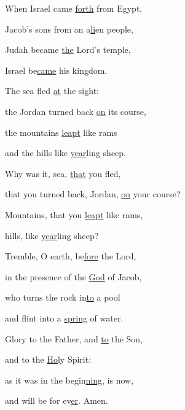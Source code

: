 \noindent When Israel came \uline{forth} from Egypt,~\GreStar{}~\nopagebreak

Jacob’s sons from an a\uline{li}en people,

\noindent Judah became \uline{the} Lord’s temple,~\GreStar{}~\nopagebreak

Israel be\uline{came} his kingdom.

\noindent The sea fled \uline{at} the sight:~\GreStar{}~\nopagebreak

the Jordan turned back \uline{on} its course,

\noindent the mountains \uline{leapt} like rams~\GreStar{}~\nopagebreak

and the hills like \uline{year}ling sheep.

\noindent Why was it, sea, \uline{that} you fled,~\GreStar{}~\nopagebreak

that you turned back, Jordan, \uline{on} your course?

\noindent Mountains, that you \uline{leapt} like rams,~\GreStar{}~\nopagebreak

hills, like \uline{year}ling sheep?

\noindent Tremble, O earth, be\uline{fore} the Lord,~\GreStar{}~\nopagebreak

in the presence of the \uline{God} of Jacob,

\noindent who turns the rock in\uline{to} a pool~\GreStar{}~\nopagebreak

and flint into a \uline{spring} of water.

\noindent Glory to the Father, and \uline{to} the Son,~\GreStar{}~\nopagebreak

and to the \uline{Ho}ly Spirit:

\noindent as it was in the begin\uline{ning}, is now,~\GreStar{}~\nopagebreak

and will be for ev\uline{er}. Amen.
